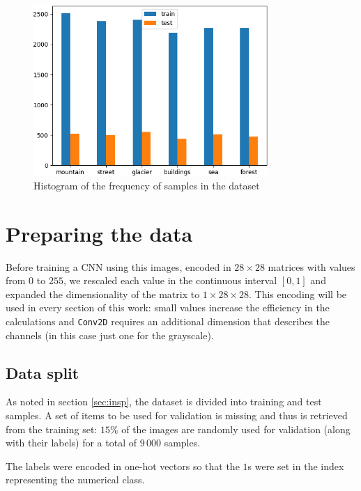 \documentclass[compsoc]{IEEEtran}
\begin{document}
\begin{figure}[ht!]
\centering                                                                        
\includegraphics[width=3.5in]{../images/data.png}
\captionsetup{justification=centering}                                                                                         
\caption{Histogram of the frequency of samples in the dataset}
\label{fig:hist}                                                                                                                               
\end{figure}

\section{Preparing the data}
Before training a CNN using this images, encoded in $28\times28$ matrices with values from $0$ to $255$, we rescaled each value in the continuous interval $[0, 1]$ and expanded the dimensionality of the matrix to $1 \times 28 \times 28$. This encoding will be used in every section of this work: small values increase the efficiency in the calculations and \texttt{Conv2D} requires an additional dimension that describes the channels (in this case just one for the grayscale).


\subsection{Data split}
As noted in section \ref{sec:insp}, the dataset is divided into training and test samples. A set of items to be used for validation is missing and thus
is retrieved from the training set: $15\%$ of the images are randomly used for validation (along with their labels) for a total of $9\,000$ samples. \par
The labels were encoded in one-hot vectors so that the $1$s were set in the index representing the numerical class. \par
\end{document}
